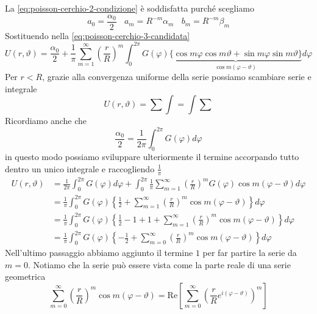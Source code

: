 \documentclass[10pt,a4paper,twoside,openright]{book}
\begin{document}
\begin{dimostrazione}
La \eqref{eq:poisson-cerchio-2-condizione} è soddisfatta purché scegliamo
\begin{equation*}
a_{0} =\frac{\alpha _{0}}{2} \ \ \ \ a_{m} =R^{-m} \alpha _{m} \ \ \ \ b_{m} =R^{-m} \beta _{m}
\end{equation*}
Sostituendo nella \eqref{eq:poisson-cerchio-3-candidata}
\begin{equation*}
U(r,\vartheta) =\frac{\alpha _{0}}{2} +\frac{1}{\pi }\sum\limits ^{\infty }_{m=1}\left(\frac{r}{R}\right)^{m}\int ^{2\pi }_{0} G(\varphi)\underbrace{\{\cos m\varphi \cos m\vartheta +\sin m\varphi \sin m\vartheta \}}_{\cos m(\varphi -\vartheta)} d\varphi 
\end{equation*}
Per $r< R$, grazie alla convergenza uniforme della serie possiamo scambiare serie e integrale
\begin{equation*}
U(r,\vartheta) =\sum \int =\int \sum 
\end{equation*}
Ricordiamo anche che
\begin{equation*}
\frac{\alpha _{0}}{2} =\frac{1}{2\pi }\int ^{2\pi }_{0} G(\varphi) d\varphi 
\end{equation*}
in questo modo possiamo sviluppare ulteriormente il termine accorpando tutto dentro un unico integrale e raccogliendo $\frac{1}{\pi }$
\begin{align}
U(r,\vartheta) & =\frac{1}{2\pi }\int ^{2\pi }_{0} G(\varphi) d\varphi +\int ^{2\pi }_{0}\frac{1}{\pi }\sum\limits ^{\infty }_{m=1}\left(\frac{r}{R}\right)^{m} G(\varphi)\cos m(\varphi -\vartheta) d\varphi \nonumber\\
 & =\frac{1}{\pi }\int ^{2\pi }_{0} G(\varphi)\left\{\frac{1}{2} +\sum\limits ^{\infty }_{m=1}\left(\frac{r}{R}\right)^{m}\cos m(\varphi -\vartheta)\right\} d\varphi \nonumber\\
 & =\frac{1}{\pi }\int ^{2\pi }_{0} G(\varphi)\left\{\frac{1}{2} -1+1+\sum\limits ^{\infty }_{m=1}\left(\frac{r}{R}\right)^{m}\cos m(\varphi -\vartheta)\right\} d\varphi \nonumber\\
 & =\frac{1}{\pi }\int ^{2\pi }_{0} G(\varphi)\left\{-\frac{1}{2} +\sum\limits ^{\infty }_{m=0}\left(\frac{r}{R}\right)^{m}\cos m(\varphi -\vartheta)\right\} d\varphi \label{eq:poisson-cerchio-1}
\end{align}
Nell'ultimo passaggio abbiamo aggiunto il termine $1$ per far partire la serie da $m=0$. Notiamo che la serie può essere vista come la parte reale di una serie geometrica
\begin{equation*}
\sum\limits ^{\infty }_{m=0}\left(\frac{r}{R}\right)^{m}\cos m(\varphi -\vartheta) =\mathrm{Re}\left[\sum\limits ^{\infty }_{m=0}\left(\frac{r}{R} e^{i(\varphi -\vartheta)}\right)^{m}\right]

\end{equation*}
\end{dimostrazione}
\end{document}
